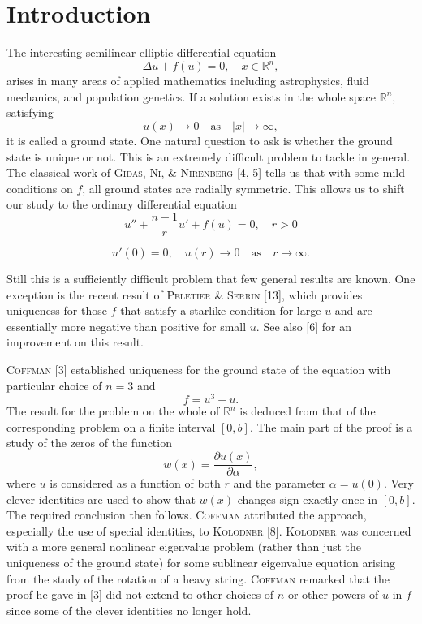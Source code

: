\section{Introduction}

The interesting semilinear elliptic differential equation
\begin{equation}
  \Delta u + f(u) = 0, \quad x\in \mathbb{R}^n,
\end{equation}
arises in many areas of applied mathematics including astrophysics,
fluid mechanics, and population genetics.
If a solution exists in the whole space $\mathbb{R}^n$, satisfying
\begin{equation}
  u(x) \to 0 \quad \text{as} \quad |x| \to \infty,
\end{equation}
it is called a ground state.
One natural question to ask is whether the ground state is unique or not.
This is an extremely difficult problem to tackle in general.
The classical work of \textsc{Gidas}, \textsc{Ni}, \& \textsc{Nirenberg}
[4, 5] tells us that with some mild conditions on $f$, all ground states are
radially symmetric. This allows us to shift our study to the ordinary differential equation
\begin{equation}
  u'' + \frac{n-1}{r} u' + f(u) = 0,\quad r>0
\end{equation}

\begin{equation}
  u'(0) = 0,\quad u(r)\to 0\quad \text{as} \quad r\to\infty.
\end{equation}

Still this is a sufficiently difficult problem that few general results are known.
One exception is the recent result of \textsc{Peletier} \& \textsc{Serrin} [13],
which provides uniqueness for those $f$ that satisfy a starlike condition for large $u$
and are essentially more negative than positive for small $u$.
See also [6] for an improvement on this result.

\textsc{Coffman} [3] established uniqueness for the ground state of the equation
with particular choice of $n=3$ and
\begin{equation}
  f = u^3 - u.
\end{equation}
The result for the problem on the whole of $\mathbb{R}^n$ is deduced from that
of the corresponding problem on a finite interval $[0,b]$.
The main part of the proof is a study of the zeros of the function
\begin{equation}
  w(x) = \frac{\partial u(x)}{\partial \alpha},
\end{equation}
where $u$ is considered as a function of both $r$ and the parameter $\alpha=u(0)$.
Very clever identities are used to show that $w(x)$ changes sign exactly once in $[0,b]$.
The required conclusion then follows.
\textsc{Coffman} attributed the approach, especially the use of special identities,
to \textsc{Kolodner} [8]. \textsc{Kolodner} was concerned with a more general 
nonlinear eigenvalue problem (rather than just the uniqueness of the ground state)
for some sublinear eigenvalue equation arising from the study of the rotation of a heavy string.
\textsc{Coffman} remarked that the proof he gave in [3] did not extend to other
choices of $n$ or other powers of $u$ in $f$ since some of the clever identities
no longer hold.

